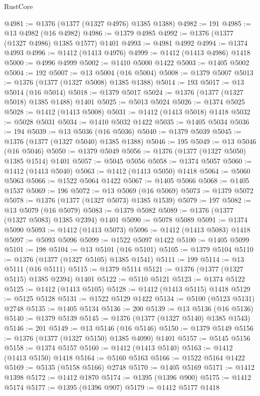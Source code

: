 \begin{lexlean}{RustCore}
\begin{coremodule}
@4981 := @1376 (@1377 (@1327 @4976) @1385 @1388)
@4982 := 191
@4985 := @13 @4982 (@16 @4982)
@4986 := @1379 @4985
@4992 := @1376 (@1377 (@1327 @4986) @1385 @1577) @1401
@4993 := @4981 @4992
@4994 := @1374 @4993
@4996 := @1412 (@1413 @4976)
@4999 := @1412 (@1413 @4986) @1418
@5000 := @4996 @4999
@5002 := @1410 @5000 @1422
@5003 := @1405 @5002
@5004 := 192
@5007 := @13 @5004 (@16 @5004)
@5008 := @1379 @5007
@5013 := @1376 (@1377 (@1327 @5008) @1385 @1388)
@5014 := 193
@5017 := @13 @5014 (@16 @5014)
@5018 := @1379 @5017
@5024 := @1376 (@1377 (@1327 @5018) @1385 @1488) @1401
@5025 := @5013 @5024
@5026 := @1374 @5025
@5028 := @1412 (@1413 @5008)
@5031 := @1412 (@1413 @5018) @1418
@5032 := @5028 @5031
@5034 := @1410 @5032 @1422
@5035 := @1405 @5034
@5036 := 194
@5039 := @13 @5036 (@16 @5036)
@5040 := @1379 @5039
@5045 := @1376 (@1377 (@1327 @5040) @1385 @1388)
@5046 := 195
@5049 := @13 @5046 (@16 @5046)
@5050 := @1379 @5049
@5056 := @1376 (@1377 (@1327 @5050) @1385 @1514) @1401
@5057 := @5045 @5056
@5058 := @1374 @5057
@5060 := @1412 (@1413 @5040)
@5063 := @1412 (@1413 @5050) @1418
@5064 := @5060 @5063
@5066 := @1522 @5064 @1422
@5067 := @1405 @5066
@5068 := @1405 @1537
@5069 := 196
@5072 := @13 @5069 (@16 @5069)
@5073 := @1379 @5072
@5078 := @1376 (@1377 (@1327 @5073) @1385 @1539)
@5079 := 197
@5082 := @13 @5079 (@16 @5079)
@5083 := @1379 @5082
@5089 := @1376 (@1377 (@1327 @5083) @1385 @2394) @1401
@5090 := @5078 @5089
@5091 := @1374 @5090
@5093 := @1412 (@1413 @5073)
@5096 := @1412 (@1413 @5083) @1418
@5097 := @5093 @5096
@5099 := @1522 @5097 @1422
@5100 := @1405 @5099
@5101 := 198
@5104 := @13 @5101 (@16 @5101)
@5105 := @1379 @5104
@5110 := @1376 (@1377 (@1327 @5105) @1385 @1541)
@5111 := 199
@5114 := @13 @5111 (@16 @5111)
@5115 := @1379 @5114
@5121 := @1376 (@1377 (@1327 @5115) @1385 @2394) @1401
@5122 := @5110 @5121
@5123 := @1374 @5122
@5125 := @1412 (@1413 @5105)
@5128 := @1412 (@1413 @5115) @1418
@5129 := @5125 @5128
@5131 := @1522 @5129 @1422
@5134 := @5100 (@5123 @5131) @2748
@5135 := @1405 @5134
@5136 := 200
@5139 := @13 @5136 (@16 @5136)
@5140 := @1379 @5139
@5145 := @1376 (@1377 (@1327 @5140) @1385 @1543)
@5146 := 201
@5149 := @13 @5146 (@16 @5146)
@5150 := @1379 @5149
@5156 := @1376 (@1377 (@1327 @5150) @1385 @4090) @1401
@5157 := @5145 @5156
@5158 := @1374 @5157
@5160 := @1412 (@1413 @5140)
@5163 := @1412 (@1413 @5150) @1418
@5164 := @5160 @5163
@5166 := @1522 @5164 @1422
@5169 := @5135 (@5158 @5166) @2748
@5170 := @1405 @5169
@5171 := @1412 @1398
@5172 := @1412 @1870
@5174 := @1395 (@1396 @900)
@5175 := @1412 @5174
@5177 := @1395 (@1396 @907)
@5179 := @1412 @5177 @1418

\end{coremodule}
\end{lexlean}
